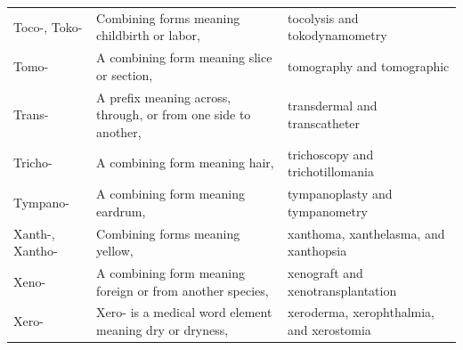 \begin{longtable}{>{\raggedright\arraybackslash}p{} >{\raggedright\arraybackslash}p{} >{\raggedright\arraybackslash}p{}}
Toco-, Toko- & Combining forms meaning childbirth or labor, & tocolysis and tokodynamometry \\
Tomo- & A combining form meaning slice or section, & tomography and tomographic \\
Trans- & A prefix meaning across, through, or from one side to another, & transdermal and transcatheter \\
Tricho- & A combining form meaning hair, & trichoscopy and trichotillomania \\
Tympano- & A combining form meaning eardrum, & tympanoplasty and tympanometry \\
Xanth-, Xantho- & Combining forms meaning yellow, & xanthoma, xanthelasma, and xanthopsia \\
Xeno- & A combining form meaning foreign or from another species, & xenograft and xenotransplantation \\
Xero- & Xero- is a medical word element meaning dry or dryness, & xeroderma, xerophthalmia, and xerostomia \\
\bottomrule
\end{longtable}
